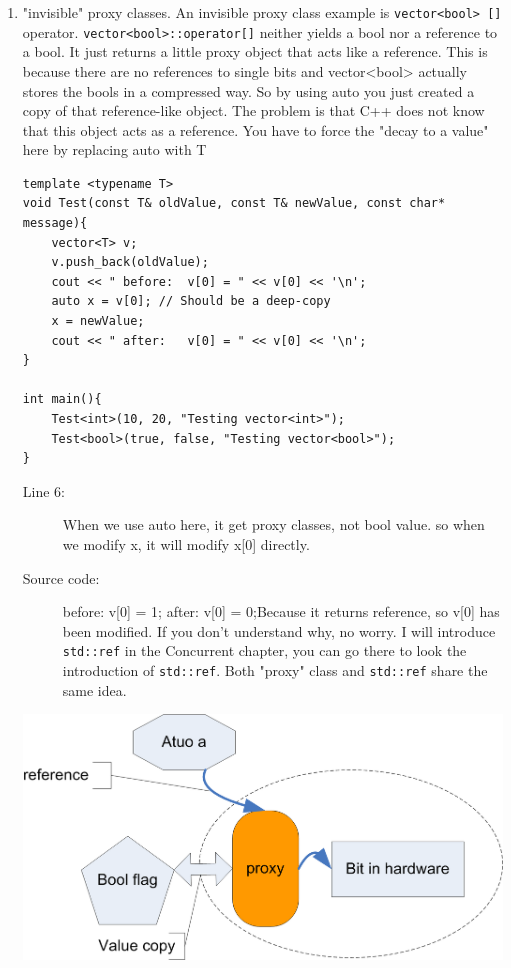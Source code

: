 \documentclass[a4paper,11pt,twoside]{book}
\begin{document}
	\begin{enumerate}
		\item "invisible" proxy classes. An invisible proxy class example is \texttt{vector<bool> []} operator. \texttt{vector<bool>::operator[]} neither yields a bool nor a reference to a bool. It just returns a little proxy object that acts like a reference. This is because there are no references to single bits and vector<bool> actually stores the bools in a compressed way. So by using auto you just created a copy of that reference-like object. The problem is that C++ does not know that this object acts as a reference. You have to force the "decay to a value" here by replacing auto with T
\begin{lstlisting}
template <typename T>
void Test(const T& oldValue, const T& newValue, const char* message){
	vector<T> v;
	v.push_back(oldValue);
	cout << " before:  v[0] = " << v[0] << '\n';
	auto x = v[0]; // Should be a deep-copy
	x = newValue;
	cout << " after:   v[0] = " << v[0] << '\n';
}

int main(){
	Test<int>(10, 20, "Testing vector<int>");
	Test<bool>(true, false, "Testing vector<bool>");
}
\end{lstlisting}
\begin{description}
	\item[Line 6:] When we use auto here, it get proxy classes, not bool value. so when we modify x, it will modify x[0] directly.
	
	\item[Source code:] before:  v[0] = 1; after:   v[0] = 0;Because it returns reference,  so v[0] has been modified. If you don't understand why, no worry. I will introduce \texttt{std::ref} in the Concurrent chapter, you can go there to look the introduction of \texttt{std::ref}. Both "proxy" class and \texttt{std::ref} share the same idea.
\end{description}

\begin{center}
	\includegraphics[width=0.6\linewidth]{pics/auto2.png}
\end{center}


\end{enumerate}
\end{document}

